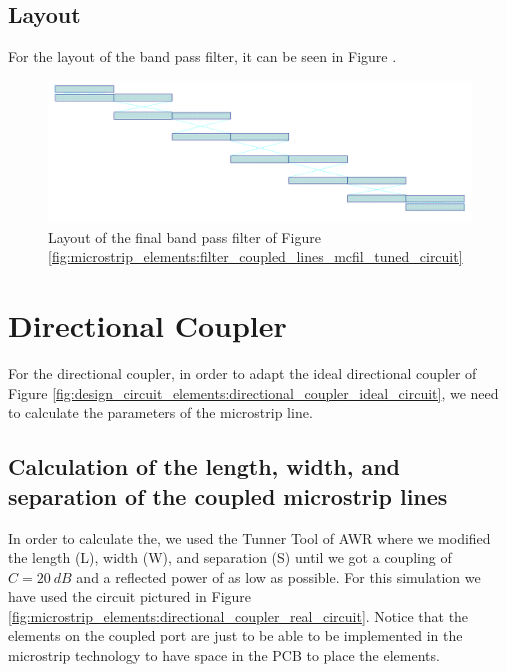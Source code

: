 \documentclass[12pt]{report} %
\let\oldsection\section
\renewcommand\section{\clearpage\oldsection}
\begin{document}
\subsection{Layout}

For the layout of the band pass filter, it can be seen in Figure .

\begin{figure}[htbp]
    \centering
    \includegraphics[width=1\linewidth]{images//microstrip_elements/filter_coupled_lines_mcfil_tuned_layout.png}
    \caption{Layout of the final band pass filter of Figure \ref{fig:microstrip_elements:filter_coupled_lines_mcfil_tuned_circuit}}
    \label{fig:microstrip_elements:filter_coupled_lines_mcfil_tuned_layout}
\end{figure}

\section{Directional Coupler}

For the directional coupler, in order to adapt the ideal directional coupler of Figure \ref{fig:design_circuit_elements:directional_coupler_ideal_circuit}, we need to calculate the parameters of the microstrip line.

\subsection{Calculation of the length, width, and separation of the coupled microstrip lines}

In order to calculate the, we used the Tunner Tool of AWR where we modified the length (L), width (W), and separation (S) until we got a coupling of $C = 20 \ dB$ and a reflected power of as low as possible. For this simulation we have used the circuit pictured in Figure \ref{fig:microstrip_elements:directional_coupler_real_circuit}. Notice that the elements on the coupled port are just to be able to be implemented in the microstrip technology to have space in the PCB to place the elements. 
\end{document}
